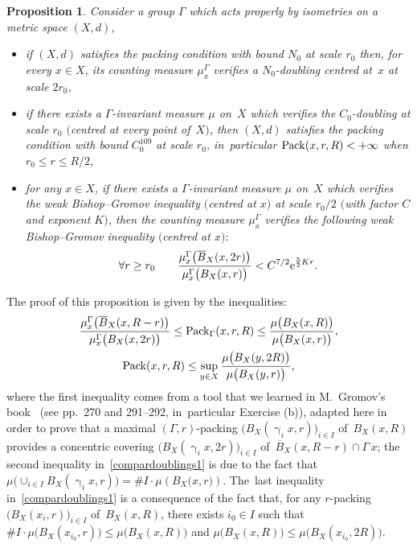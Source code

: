 \documentclass[pdftex]{sigma}
\numberwithin{equation}{section}
\newtheorem{prop}[theor]{Proposition}
\newcommand{\g}{\operatorname{\gamma}}
\begin{document}
\begin{prop}\label{comparedoublings} Consider a group $\Gamma$ which acts
properly by isometries on a metric space $ (X,d)$,
\begin{itemize}\itemsep=0pt
\item[$(i)$]
if $(X,d)$ satisfies the packing condition with bound $N_0$ at scale $r_0$ then, for every $x \in X$, its counting measure $\mu_{x}^{\Gamma}$
verifies a $N_0$-doubling centred at~$x$ at scale $2 r_0$,
\item[$(ii)$]
if there exists a $\Gamma $-invariant measure $\mu$ on~$X$ which verifies the $ C_0 $-doubling at scale $r_0$ $($centred at every point of~$X)$, then $ (X,d)$ satisfies the packing condition with bound $C_0^{109}$ at scale $r_0$, in~particular ${\rm Pack} (x, r, R) < +\infty$ when $r_0 \le r \le R/2$,
\item[$(iii)$]
for any $x \in X$, if there exists a $\Gamma $-invariant measure $\mu$ on~$X$ which verifies the weak Bishop--Gromov inequality $($centred at $x)$
at scale $r_0/2$ $($with factor $C$ and exponent $K)$, then
the counting measure $\mu_{x}^{\Gamma} $ verifies the following weak Bishop--Gromov inequality $($centred at $x){:}$
\begin{gather*}
\forall r \ge r_0\qquad
\dfrac{\mu_{x}^{\Gamma} \big(\overline B_X(x, 2 r)\big)}{\mu_{x}^{\Gamma} \big(B_X ( x, r)\big)} < C^{7/2} {\rm e}^{\frac{5}{2}K r}.
\end{gather*}
\end{itemize}
\end{prop}

The proof of this proposition is given by the inequalities:
\begin{gather}
\dfrac{\mu_{x}^{\Gamma} \big(\overline B_X(x, R- r)\big)}{\mu_{x}^{\Gamma}\big(B_X ( x, 2 r)\big)}
\le {\rm Pack}_\Gamma (x, r, R) \le \dfrac{\mu \big(B_X(x, R)\big)}{\mu\big(B_X(x,r)\big)},\nonumber
\\
\label{compardoublings1}
{\rm Pack} (x, r, R) \le \sup_{y \in X} \dfrac{\mu \big(B_X(y, 2R)\big)}{\mu\big(B_X(y, r)\big)},
\end{gather}
where the first inequality comes from a tool that we learned in M.~Gromov's book~\cite{Gr1} (see pp.~270 and 291--292, in~particular Exercise (b)), adapted here in order to prove that a maximal
$(\Gamma,r)$-packing $\big(B_X (\g_i x, r)\big)_{i \in I}$ of~$B_X (x, R)$ provides a concentric covering $\big(B_X (\g_i x, 2 r)\big)_{i \in I}$ of~$\overline B_X (x, R- r) \cap \Gamma \,x$; the second inequality in~\eqref{compardoublings1} is due to the fact that
$\mu \big(\cup_{i \in I} B_X (\g_i x, r)\big) = \# I \cdot \mu \left(B_X \big( x, r \big) \right)$. The~last inequality in~\eqref{compardoublings1} is a consequence
of the fact that, for any $r$-packing $\big(B_X(x_i,r)\big)_{i \in I}$ of~$B_X (x,R)$, there exists $i_0 \in I$ such that
$\# I \cdot \mu \big(B_X(x_{i_0}, r)\big) \le \mu \big(B_X(x, R)\big)$ and $\mu \big(B_X(x, R)\big) \le
\mu \big(B_X( x_{i_0}, 2 R)\big)$.
\end{document}
